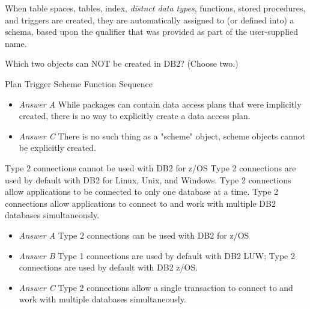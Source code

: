 \documentclass[answers, 11pt]{exam}
\begin{document}
\begin{questions}
\begin{solution}
	When table spaces, tables, index, \textit{distnct data types}, functions, stored procedures, and triggers are created, they are
	automatically assigned to (or defined into) a schema, based upon the qualifier that was provided as part of the user-supplied name.
\end{solution}

\question[1]
Which two objects can NOT be created in DB2? (Choose two.)
\begin{choices}
	\CorrectChoice Plan
	\choice Trigger
	\CorrectChoice Scheme
	\choice Function
	\choice Sequence
\end{choices}

\begin{solution}
	\begin{itemize}
		\item \textit{Answer A} While packages can contain data access plans that were implicitly created, there is no way to explicitly create a 
		data access plan.
		\item \textit{Answer C} There is no such thing as a "scheme" object, scheme objects cannot be explicitly created.
	\end{itemize}
\end{solution}

\begin{choices}
	\choice Type 2 connections cannot be used with DB2 for z/OS
	\choice Type 2 connections are used by default with DB2 for Linux, Unix, and Windows.
	\choice Type 2 connections allow applications to be connected to only one database at a time.
	\CorrectChoice Type 2 connections allow applications to connect to and work with multiple DB2 databases 
	simultaneously.
\end{choices}

\begin{solution}
	\begin{itemize}
		\item \textit{Answer A} Type 2 connections can be used with DB2 for z/OS
		\item \textit{Answer B} Type 1 connections are used by default with DB2 LUW; Type 2 connections are used by default with DB2 z/OS.
		\item \textit{Answer C} Type 2 connections allow a single transaction to connect to and work with multiple databases simultaneously.
	\end{itemize}
\end{solution}


\end{questions}
\end{document}

